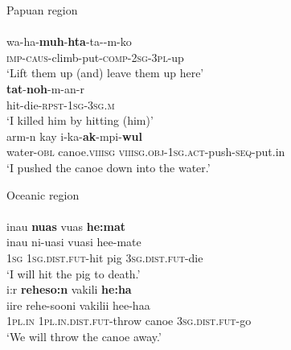\ea
Papuan region\\
\ea \label{Ala01}
\\
\gll wa-ha-\textbf{muh}-\textbf{h\textipa{\textbari}ta}-ta--m-ko\\
\textsc{imp}-\textsc{caus}-climb-put-\textsc{comp}-\textsc{2}\textsc{sg}-\textsc{3}\textsc{pl}-up\\
\glt ‘Lift them up (and) leave them up here’
\ex \label{Ala02}
\\
\gll \textbf{tat}-\textbf{noh}-m-an-r\\
hit-die-\textsc{rpst}-\textsc{1}\textsc{sg}-\textsc{3}\textsc{sg}.\textsc{m}\\
\glt ‘I killed him by hitting (him)’
\ex \label{Yim01}
\\
\gll arm-n kay i-ka-\textbf{ak}-mpi-\textbf{wul}\\
water-\textsc{obl} canoe.\textsc{viiisg} \textsc{viiisg}.\textsc{obj}-\textsc{1}\textsc{sg}.\textsc{act}-push-\textsc{seq}-put.in\\
\glt ‘I pushed the canoe down into the water.’
\z
\z

\ea
Oceanic region\\
\ea \label{Paa01}
\\
\glll inau \textbf{nuas} vuas \textbf{he:mat} \\
inau ni-uasi vuasi hee-mate\\
\textsc{1}\textsc{sg} \textsc{1}\textsc{sg}.\textsc{dist}.\textsc{fut}-hit pig \textsc{3}\textsc{sg}.\textsc{dist}.\textsc{fut}-die\\
\glt ‘I will hit the pig to death.’
\ex \label{Paa02}
\\
\glll i:r \textbf{reheso:n} vakili \textbf{he:ha}\\
iire rehe-sooni vakilii hee-haa\\
\textsc{1}\textsc{pl}.\textsc{in} \textsc{1}\textsc{pl}.\textsc{in}.\textsc{dist}.\textsc{fut}-throw canoe \textsc{3}\textsc{sg}.\textsc{dist}.\textsc{fut}-go\\
\glt ‘We will throw the canoe away.’
\z
\z

